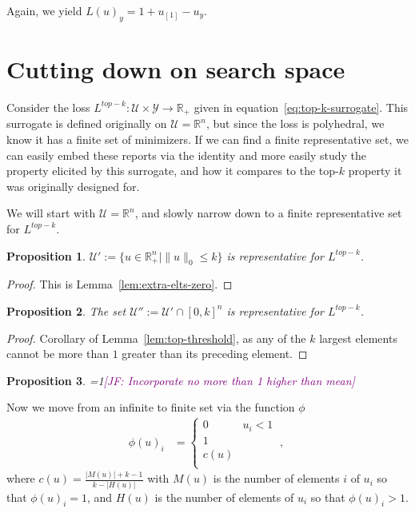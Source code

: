 \documentclass[12pt]{article}
\newcommand{\Comments}{1}
\newcommand{\mynote}[2]{\ifnum\Comments=1\textcolor{#1}{#2}\fi}
\newcommand{\jessie}[1]{\mynote{purple}{[JF: #1]}}
\newcommand{\reals}{\mathbb{R}}
\newcommand{\U}{\mathcal{U}}
\newcommand{\Y}{\mathcal{Y}}
\newtheorem{proposition}{Proposition}
\begin{document}
Again, we yield $L(u)_y = 1 + u_{[1]} - u_y$.

\section{Cutting down on search space}
Consider the loss $L^{top-k} : \U \times \Y \to \reals_+$ given in equation~\eqref{eq:top-k-surrogate}.
This surrogate is defined originally on $\U = \reals^n$, but since the loss is polyhedral, we know it has a finite set of minimizers.
If we can find a finite representative set, we can easily embed these reports via the identity and more easily study the property elicited by this surrogate, and how it compares to the top-$k$ property it was originally designed for.

We will start with $\U = \reals^n$, and slowly narrow down to a finite representative set for $L^{top-k}$.

\begin{proposition}
	$\U' := \{u \in \reals^n_+ \mid \|u\|_0 \leq k\}$ is representative for $L^{top-k}$.
\end{proposition}
\begin{proof}
	This is Lemma~\ref{lem:extra-elts-zero}.
\end{proof}

\begin{proposition}
	The set $\U'' := \U' \cap [0,k]^n$ is representative for $L^{top-k}$.
\end{proposition}
\begin{proof}
	Corollary of Lemma~\ref{lem:top-threshold}, as any of the $k$ largest elements cannot be more than $1$ greater than its preceding element.
\end{proof}

\begin{proposition}
	\jessie{Incorporate no more than 1 higher than mean}
\end{proposition}

Now we move from an infinite to finite set via the function $\phi$
\begin{align*}
\phi(u)_i &= 
\begin{cases}
0 & u_i < 1\\
1 & \\
c(u) & \\
\end{cases}~,~
\end{align*}
where $c(u) = \frac{|M(u)| + k - 1}{k - |H(u)|}$ with $M(u)$ is the number of elements $i$ of $u_i$ so that $\phi(u)_i = 1$, and $H(u)$ is the number of elements of $u_i$ so that $\phi(u)_i > 1$.
\end{document}

